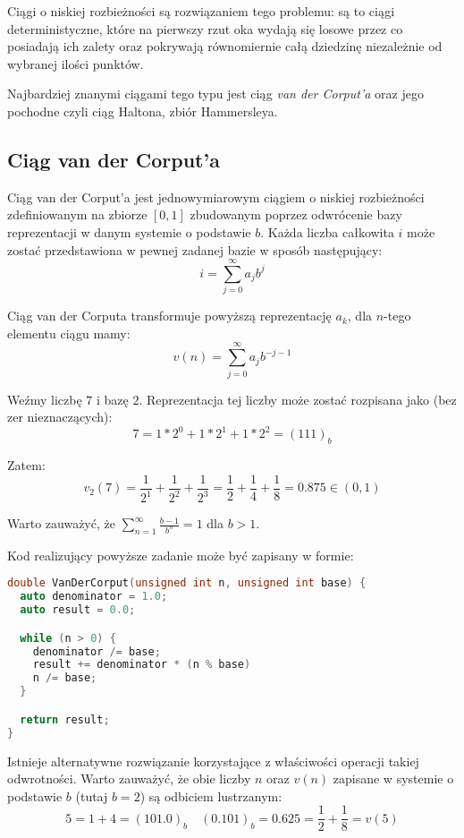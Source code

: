 \documentclass[../main.tex]{subfiles}
\begin{document}
Ciągi o niskiej rozbieżności są rozwiązaniem tego problemu: są to ciągi
deterministyczne, które na pierwszy rzut oka wydają się losowe przez co posiadają ich zalety oraz pokrywają równomiernie całą dziedzinę niezależnie od wybranej ilości punktów.

Najbardziej znanymi ciągami tego typu jest ciąg \textit{van der Corput'a} oraz jego pochodne czyli ciąg Haltona, zbiór Hammersleya.

\subsection{Ciąg van der Corput'a}

Ciąg van der Corput'a \cite{WongSamplingWH} jest jednowymiarowym ciągiem o
niskiej rozbieżności zdefiniowanym na zbiorze $[0,1]$ zbudowanym poprzez
odwrócenie bazy reprezentacji w danym systemie o podstawie $b$. Każda liczba
całkowita $i$ może zostać przedstawiona w pewnej zadanej bazie w sposób
następujący:
\[ 
i = \sum_{j=0}^{\infty} {a_j b^j} 
\]

Ciąg van der Corputa transformuje powyższą reprezentację $a_k$, dla $n$-tego
elementu ciągu mamy:
\[ 
v(n) = \sum_{j=0}^{\infty} {a_j b^{-j-1}} 
\]

\begin{example}
  Weźmy liczbę $7$ i bazę $2$. Reprezentacja tej liczby może zostać rozpisana
  jako (bez zer nieznaczących):
  \[ 
  7 = 1 * 2^0 + 1 * 2^1 + 1 * 2^2 = (111)_{b} 
  \]

  \noindent Zatem:
  \[
    v_{2}(7)
      = \frac{1}{2^{1}} + \frac{1}{2^{2}} + \frac{1}{2^{3}}
      = \frac{1}{2} + \frac{1}{4} + \frac{1}{8}
      = 0.875
      \in (0,1)
  \]
\end{example}

Warto zauważyć, że $\sum_{n=1}^{\infty} \frac{b-1}{b^n} = 1$ dla $b>1$.

Kod realizujący powyższe zadanie może być zapisany w formie:

\begin{lstlisting}[language=c++]
double VanDerCorput(unsigned int n, unsigned int base) {
  auto denominator = 1.0;
  auto result = 0.0;

  while (n > 0) {
    denominator /= base;
    result += denominator * (n % base)
    n /= base;
  }

  return result;
}
\end{lstlisting}

Istnieje alternatywne rozwiązanie korzystające z właściwości operacji takiej
odwrotności. Warto zauważyć, że obie liczby $n$ oraz $v(n)$ zapisane w systemie o podstawie $b$ (tutaj $b=2$) są odbiciem lustrzanym:
\[
  5 = 1 + 4 = (101.0)_{b} \quad
  (0.101)_{b} = 0.625 = \frac{1}{2} + \frac{1}{8} = v(5)
\]
\end{document}
